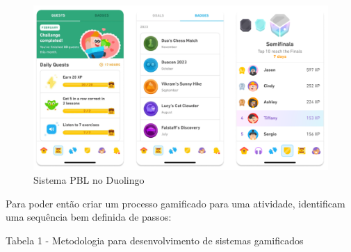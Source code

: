 \documentclass[
	12pt,
	openright,
	twoside,
	a4paper,
	english,
	brazil
	]{abntex2}
\begin{document}
\begin{figure}[H]
	\caption{\label{duolingo}Sistema PBL no Duolingo}
  \includegraphics[width=\textwidth]{duolingo}
\end{figure}

Para poder então criar um processo gamificado para uma atividade,  identificam uma sequência bem definida de passos:

Tabela 1 - Metodologia para desenvolvimento de sistemas gamificados
\end{document}
